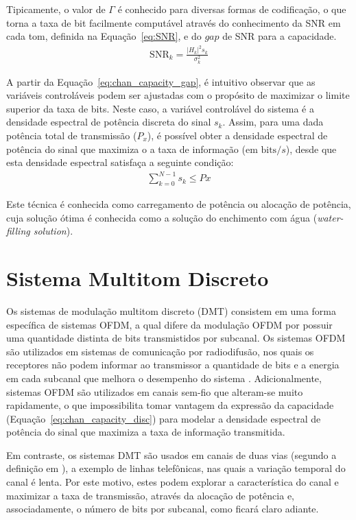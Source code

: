 Tipicamente, o valor de $\Gamma$ é conhecido para diversas formas de codificação, o que torna a taxa de bit facilmente computável através do conhecimento da SNR em cada tom, definida na Equação~\ref{eq:SNR}, e do $gap$ de SNR para a capacidade.
\begin{align}
\text{SNR}_k = \frac{ \left|H_k\right|^2 s_k }{ \sigma_k^2 } 
\label{eq:SNR}
\end{align}

A partir da Equação~\ref{eq:chan_capacity_gap}, é intuitivo observar que as variáveis controláveis podem ser ajustadas com o propósito de maximizar o limite superior da taxa de bits. Neste caso, a variável controlável do sistema é a densidade espectral de potência discreta do sinal $s_k$. Assim, para uma dada potência total de transmissão ($P_x$), é possível obter a densidade espectral de potência do sinal que maximiza o a taxa de informação (em $\text{bits}/s$), desde que esta densidade espectral satisfaça a seguinte condição:
\begin{align}
\sum \limits_{k=0}^{N-1} s_k \leq Px
\end{align}

Este técnica é conhecida como carregamento de potência ou alocação de potência, cuja solução ótima é conhecida como a solução do enchimento com água (\textsl{water-filling solution}).

\section{Sistema Multitom Discreto}
\label{sec:sistema_dmt}

Os sistemas de modulação multitom discreto (DMT) consistem em uma forma específica de sistemas OFDM, a qual difere da modulação OFDM por possuir uma quantidade distinta de bits transmistidos por subcanal. Os sistemas OFDM são utilizados em sistemas de comunicação por radiodifusão, nos quais os receptores não podem informar ao transmissor a quantidade de bits e a energia em cada subcanal que melhora o desempenho do sistema \cite{ee379c}. Adicionalmente, sistemas OFDM são utilizados em canais sem-fio que alteram-se muito rapidamente, o que impossibilita tomar vantagem da expressão da capacidade (Equação~\ref{eq:chan_capacity_disc}) para modelar a densidade espectral de potência do sinal que maximiza a taxa de informação transmitida.

Em contraste, os sistemas DMT são usados em canais de duas vias (segundo a definição em \cite{shannon1961}), a exemplo de linhas telefônicas, nas quais a variação temporal do canal é lenta. Por este motivo, estes podem explorar a característica do canal e maximizar a taxa de transmissão, através da alocação de potência e, associadamente, o número de bits por subcanal, como ficará claro adiante.

